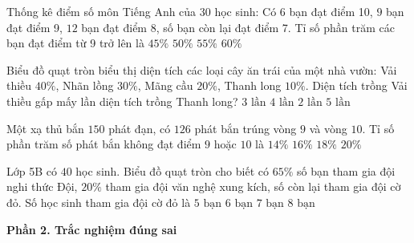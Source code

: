 \begin{ex} %
Thống kê điểm số môn Tiếng Anh của $30$ học sinh: Có $6$ bạn đạt điểm 10, $9$ bạn đạt điểm 9, $12$ bạn đạt điểm 8, số bạn còn lại đạt điểm 7. Tỉ số phần trăm các bạn đạt điểm từ 9 trở lên là
\choice
{$45\%$}
{\True $50\%$}
{$55\%$}
{$60\%$}
\end{ex}

\begin{ex} %
Biểu đồ quạt tròn biểu thị diện tích các loại cây ăn trái của một nhà vườn: Vải thiều $40\%$, Nhãn lồng $30\%$, Mãng cầu $20\%$, Thanh long $10\%$. Diện tích trồng Vải thiều gấp mấy lần diện tích trồng Thanh long?
\choice
{$3\text{ lần}$}
{\True $4\text{ lần}$}
{$2\text{ lần}$}
{$5\text{ lần}$}
\end{ex}

\begin{ex} %
Một xạ thủ bắn $150$ phát đạn, có $126$ phát bắn trúng vòng $9$ và vòng $10$. Tỉ số phần trăm số phát bắn không đạt điểm $9$ hoặc $10$ là
\choice
{$14\%$}
{\True $16\%$}
{$18\%$}
{$20\%$}
\end{ex}

\begin{ex} %
Lớp 5B có $40$ học sinh. Biểu đồ quạt tròn cho biết có $65\%$ số bạn tham gia đội nghi thức Đội, $20\%$ tham gia đội văn nghệ xung kích, số còn lại tham gia đội cờ đỏ. Số học sinh tham gia đội cờ đỏ là
\choice
{$5\text{ bạn}$}
{\True $6\text{ bạn}$}
{$7\text{ bạn}$}
{$8\text{ bạn}$}
\end{ex}

\textbf{Phần 2. Trắc nghiệm đúng sai}

